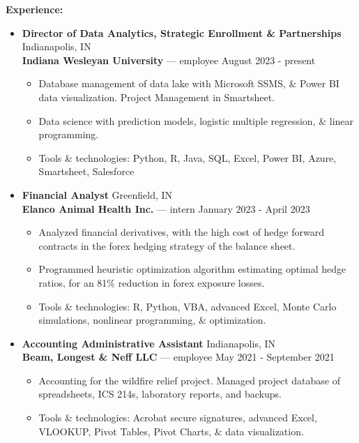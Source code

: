 \documentclass[letterpaper]{cream_class}
\begin{document}
\noindent\textcolor{burgundy}{\noindent\textbf{\large Experience:}\\[-3ex]}
\vspace{-3pt}
\begin{itemize}[noitemsep, leftmargin=*]
  \item {\large\textbf{Director of Data Analytics, Strategic Enrollment \& Partnerships}} \hfill Indianapolis, IN \\
        \textbf{Indiana Wesleyan University} — employee \hfill August 2023 - present
    \begin{itemize}[noitemsep, leftmargin=*]
      \item Database management of data lake with Microsoft SSMS, \& Power BI data visualization. Project Management in Smartsheet.
      \item Data science with prediction models, logistic multiple regression, \& linear programming.
      \item Tools \& technologies: Python, R, Java, SQL, Excel, Power BI, Azure, Smartsheet, Salesforce
    \end{itemize}    
  \item {\large\textbf{Financial Analyst}} \hfill Greenfield, IN \\
        \textbf{Elanco Animal Health Inc.} — intern \hfill January 2023 - April 2023
    \begin{itemize}[noitemsep, leftmargin=*]
      \item Analyzed financial derivatives, with the high cost of hedge forward contracts in the forex hedging strategy of the balance sheet.
      \item Programmed heuristic optimization algorithm estimating optimal hedge ratios, for an 81\% reduction in forex exposure losses.
      \item Tools \& technologies: R, Python, VBA, advanced Excel, Monte Carlo simulations, nonlinear programming, \& optimization.
    \end{itemize}        
  \item {\large\textbf{Accounting Administrative Assistant}} \hfill Indianapolis, IN \\
            \textbf{Beam, Longest \& Neff LLC} — employee \hfill May 2021 - September 2021
    \begin{itemize}[noitemsep, leftmargin=*]
      \item Accounting for the wildfire relief project. Managed project database of spreadsheets, ICS 214s, laboratory reports, and backups.
      \item Tools \& technologies: Acrobat secure signatures, advanced Excel, VLOOKUP, Pivot Tables, Pivot Charts, \& data visualization.

\end{itemize}
\end{itemize}
\end{document}
